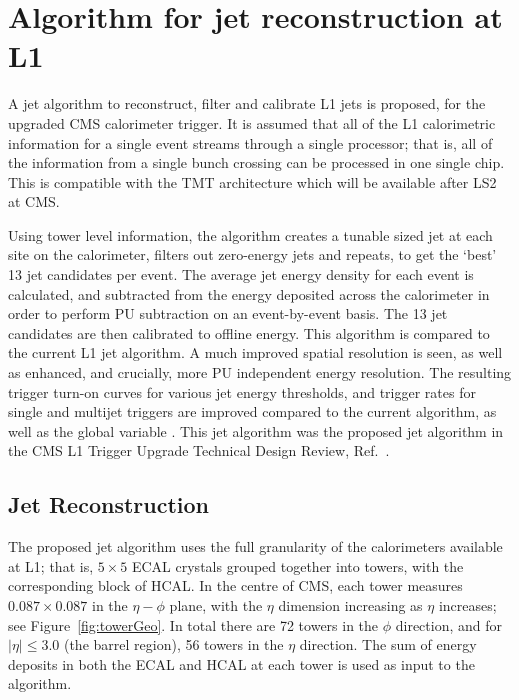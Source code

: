 \section{Algorithm for jet reconstruction at L1}
\label{Sec:Algo}
A jet algorithm to reconstruct, filter and calibrate \ac{L1} jets is proposed, for the upgraded \ac{CMS} calorimeter trigger.
It is assumed that all of the \ac{L1} calorimetric information for a single event streams through a single processor; that is, all of the information from a single bunch crossing can be processed in one single chip.
This is compatible with the \ac{TMT} architecture which will be available after \ac{LS2} at \ac{CMS}. 

Using tower level information, the algorithm creates a tunable sized jet at each site on the calorimeter, filters out zero-energy jets and repeats, to get the `best' 13 jet candidates per event. The average jet energy density for each event is calculated, and subtracted from the energy deposited across the calorimeter in order to perform \ac{PU} subtraction on an event-by-event basis. 
The 13 jet candidates are then calibrated to offline energy. 
This algorithm is compared to the current \ac{L1} jet algorithm.%
A much improved spatial resolution is seen, as well as enhanced, and crucially, more \ac{PU} independent energy resolution. 
The resulting trigger turn-on curves for various jet energy thresholds, and trigger rates for single and multijet triggers are improved compared to the current algorithm, as well as the global variable \HT.
This jet algorithm was the proposed jet algorithm in the \ac{CMS} \ac{L1} Trigger Upgrade Technical Design Review, Ref.~\cite{Tapper:1556311}.


\subsection{Jet Reconstruction}

The proposed jet algorithm uses the full granularity of the calorimeters available at \ac{L1}; that is, $5 \times 5$ \ac{ECAL} crystals grouped together into towers, with the corresponding block of \ac{HCAL}. 
In the centre of \ac{CMS}, each tower measures $0.087\times0.087$ in the $\eta-\phi$ plane, with the $\eta$ dimension increasing as $\eta$ increases; see Figure~\ref{fig:towerGeo}. 
In total there are 72 towers in the $\phi$ direction, and for $|\eta|\leq3.0$ (the barrel region), 56 towers in the $\eta$ direction.
The sum of energy deposits in both the \ac{ECAL} and \ac{HCAL} at each tower is used as input to the algorithm. 

